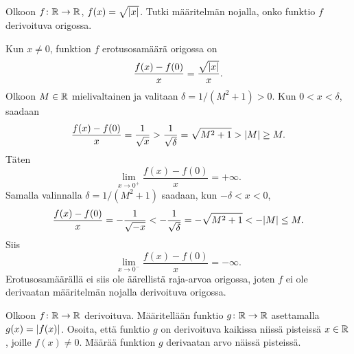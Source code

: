 \documentclass[11pt,a4paper]{amsart}
\begin{document}
\begin{exercise}
  \label{ex:sqrt-abs-origin}
  Olkoon \(f \colon \mathbb{R} \to \mathbb{R}\),
  \(f(x) = \sqrt{\lvert x\rvert}\). Tutki määritelmän nojalla, onko funktio
  \(f\) derivoituva origossa.
\end{exercise}

\begin{solution}
  Kun \(x \neq 0\), funktion \(f\) erotusosamäärä origossa on
  \[
    \frac{f(x) - f(0)}{x} = \frac{\sqrt{\lvert x\rvert}}{x}.
  \]
  Olkoon \(M \in \mathbb{R}\) mielivaltainen ja valitaan
  \(\delta = 1/(M^2 + 1) > 0\). Kun \(0 < x < \delta\), saadaan
  \[
    \frac{f(x) - f(0)}{x}
    = \frac{1}{\sqrt{x}}
    > \frac{1}{\sqrt{\delta}}
    = \sqrt{M^2 + 1} > \lvert M\rvert \geq M.
  \]
  Täten
  \[
    \lim_{x \to 0^+} \frac{f(x) - f(0)}{x} = +\infty.
  \]
  Samalla valinnalla \(\delta = 1/(M^2 + 1)\) saadaan, kun
  \(-\delta < x < 0\),
  \[
    \frac{f(x) - f(0)}{x}
    = -\frac{1}{\sqrt{-x}}
    < -\frac{1}{\sqrt{\delta}}
    = -\sqrt{M^2 + 1} < -\lvert M\rvert \leq M.
  \]
  Siis
  \[
    \lim_{x \to 0^-} \frac{f(x) - f(0)}{x} = -\infty.
  \]
  Erotusosamäärällä ei siis ole äärellistä raja-arvoa origossa, joten
  \(f\) ei ole derivaatan määritelmän nojalla derivoituva origossa.
\end{solution}

\begin{exercise}
  Olkoon \(f \colon \mathbb{R} \to \mathbb{R}\) derivoituva.
  Määritellään funktio \(g \colon \mathbb{R} \to \mathbb{R}\) asettamalla
  \(g(x) = \lvert f(x)\rvert\). Osoita, että funktio \(g\) on derivoituva
  kaikissa niissä pisteissä \(x \in \mathbb{R}\), joille \(f(x) \neq 0\).
  Määrää funktion \(g\) derivaatan arvo näissä pisteissä.
\end{exercise}
\end{document}
